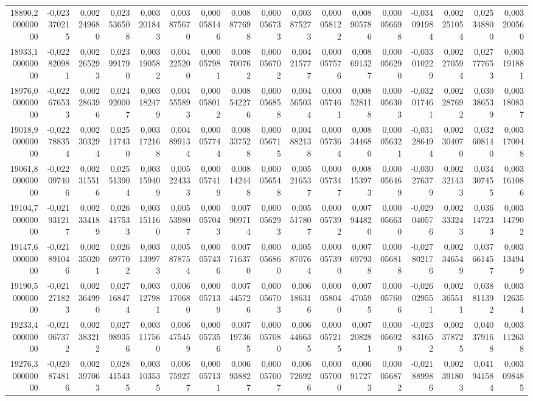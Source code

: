 \begin{longtable}{rrrrrrrrrrrrrrrrr}
18890,200000000 & -0,023370215 & 0,002249680 & 0,023536508 & 0,003201843 & 0,003875670 & 0,000058146 & 0,008877698 & 0,000056733 & 0,003875273 & 0,000058122 & 0,008905786 & 0,000056698 & -0,034091984 & 0,002251054 & 0,025348800 & 0,003200560\\
18933,100000000 & -0,022820981 & 0,002265293 & 0,023991790 & 0,003190582 & 0,004225200 & 0,000057981 & 0,008700762 & 0,000056702 & 0,004215777 & 0,000057576 & 0,008691327 & 0,000056290 & -0,033010229 & 0,002270594 & 0,027777653 & 0,003191881\\
18976,000000000 & -0,022676533 & 0,002286396 & 0,024920007 & 0,003182479 & 0,004555893 & 0,000058012 & 0,008542276 & 0,000056858 & 0,004565034 & 0,000057461 & 0,008528118 & 0,000056303 & -0,032017461 & 0,002287692 & 0,030386539 & 0,003180837\\
19018,900000000 & -0,022788354 & 0,002303294 & 0,025117430 & 0,003172168 & 0,004899134 & 0,000057744 & 0,008337528 & 0,000056715 & 0,004882138 & 0,000057364 & 0,008344680 & 0,000056321 & -0,031286494 & 0,002304070 & 0,032608140 & 0,003170048\\
19061,800000000 & -0,022097406 & 0,002315516 & 0,025513904 & 0,003159409 & 0,005224333 & 0,000057419 & 0,008142448 & 0,000056548 & 0,005216537 & 0,000057347 & 0,008153973 & 0,000056469 & -0,030276379 & 0,002321433 & 0,034307455 & 0,003161086\\
19104,700000000 & -0,021931217 & 0,002334189 & 0,026417533 & 0,003151160 & 0,005539807 & 0,000057043 & 0,007909714 & 0,000056293 & 0,005517807 & 0,000057392 & 0,007944820 & 0,000056630 & -0,029040576 & 0,002333243 & 0,036147233 & 0,003147902\\
19147,600000000 & -0,021891046 & 0,002350201 & 0,026697702 & 0,003139973 & 0,005878754 & 0,000057436 & 0,007716370 & 0,000056860 & 0,005870764 & 0,000057390 & 0,007697938 & 0,000056818 & -0,027802176 & 0,002346549 & 0,037661457 & 0,003134949\\
19190,500000000 & -0,021271823 & 0,002364990 & 0,027168474 & 0,003127981 & 0,006170680 & 0,000057139 & 0,007445726 & 0,000056703 & 0,006186316 & 0,000058040 & 0,007470595 & 0,000057606 & -0,026029551 & 0,002365511 & 0,038811392 & 0,003126354\\
19233,400000000 & -0,021067372 & 0,002383212 & 0,027989356 & 0,003117560 & 0,006475459 & 0,000057356 & 0,007197365 & 0,000057080 & 0,006446635 & 0,000057215 & 0,007208281 & 0,000056929 & -0,023831652 & 0,002378725 & 0,040379168 & 0,003112638\\
19276,300000000 & -0,020874816 & 0,002397063 & 0,028415435 & 0,003103535 & 0,006759277 & 0,000057131 & 0,006938827 & 0,000057007 & 0,006726926 & 0,000057000 & 0,006917273 & 0,000056872 & -0,021889986 & 0,002391803 & 0,041941584 & 0,003098485\\

\end{longtable}

